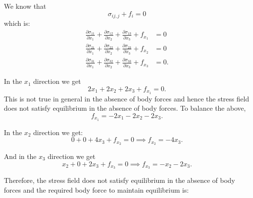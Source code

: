   \begin{derivation}
    We know that
    \begin{equation*}
      \sigma_{ij,j} + f_i = 0
    \end{equation*}
    which is:
    \begin{align*}
      \frac{\partial \sigma_{11}}{\partial x_1} + \frac{\partial \sigma_{12}}{\partial x_2} + \frac{\partial \sigma_{13}}{\partial x_3} + f_{x_1} &= 0 \\
      \frac{\partial \sigma_{21}}{\partial x_1} + \frac{\partial \sigma_{22}}{\partial x_2} + \frac{\partial \sigma_{23}}{\partial x_3} + f_{x_2} &= 0 \\
      \frac{\partial \sigma_{31}}{\partial x_1} + \frac{\partial \sigma_{32}}{\partial x_2} + \frac{\partial \sigma_{33}}{\partial x_3} + f_{x_3} &= 0
    .\end{align*}

    In the $x_1$ direction we get
    \begin{equation*}
      2x_1 + 2x_2 + 2x_3 + f_{x_1} = 0 
    .\end{equation*}
    This is not true in general in the absence of body forces and hence the stress field does not satisfy equilibrium in the absence of body forces. To balance the above,
    \begin{equation*}
      f_{x_1} = - 2x_1 - 2x_2 - 2x_3
    .\end{equation*}
    
    In the $x_2$ direction we get:
    \begin{equation*}
      0 + 0 + 4x_3 + f_{x_2} = 0 \implies f_{x_2} = - 4x_3
    .\end{equation*}
    
    And in the $x_3$ direction we get
    \begin{equation*}
      x_2 + 0 + 2x_3 + f_{x_3} = 0 \implies f_{x_3} = - x_2 - 2x_3
    .\end{equation*}
    
    Therefore, the stress field does not satisfy equilibrium in the absence of body forces and the required body force to maintain equilibrium is:
  \end{derivation}


